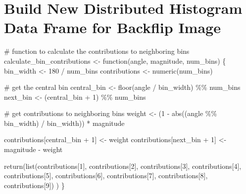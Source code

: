 \documentclass[
  letterpaper,
  DIV=11,
  numbers=noendperiod]{scrreprt}
\newenvironment{Shaded}{\begin{snugshade}}{\end{snugshade}}
\newcommand{\CommentTok}[1]{\textcolor[rgb]{0.37,0.37,0.37}{#1}}
\newcommand{\ControlFlowTok}[1]{\textcolor[rgb]{0.00,0.23,0.31}{#1}}
\newcommand{\DecValTok}[1]{\textcolor[rgb]{0.68,0.00,0.00}{#1}}
\newcommand{\FunctionTok}[1]{\textcolor[rgb]{0.28,0.35,0.67}{#1}}
\newcommand{\NormalTok}[1]{\textcolor[rgb]{0.00,0.23,0.31}{#1}}
\newcommand{\OtherTok}[1]{\textcolor[rgb]{0.00,0.23,0.31}{#1}}
\newcommand{\SpecialCharTok}[1]{\textcolor[rgb]{0.37,0.37,0.37}{#1}}
\begin{document}
\section{Build New Distributed Histogram Data Frame for Backflip
Image}\label{build-new-distributed-histogram-data-frame-for-backflip-image}

\begin{Shaded}
\begin{Highlighting}[]
\CommentTok{\# function to calculate the contributions to neighboring bins}
\NormalTok{calculate\_bin\_contributions }\OtherTok{\textless{}{-}} \ControlFlowTok{function}\NormalTok{(angle, magnitude, num\_bins) \{}
\NormalTok{  bin\_width }\OtherTok{\textless{}{-}} \DecValTok{180} \SpecialCharTok{/}\NormalTok{ num\_bins}
\NormalTok{  contributions }\OtherTok{\textless{}{-}} \FunctionTok{numeric}\NormalTok{(num\_bins)}
  
  \CommentTok{\# get the central bin}
\NormalTok{  central\_bin }\OtherTok{\textless{}{-}} \FunctionTok{floor}\NormalTok{(angle }\SpecialCharTok{/}\NormalTok{ bin\_width) }\SpecialCharTok{\%\%}\NormalTok{ num\_bins}
\NormalTok{  next\_bin }\OtherTok{\textless{}{-}}\NormalTok{ (central\_bin }\SpecialCharTok{+} \DecValTok{1}\NormalTok{) }\SpecialCharTok{\%\%}\NormalTok{ num\_bins}
  
  \CommentTok{\# get contributions to neighboring bins}
\NormalTok{  weight }\OtherTok{\textless{}{-}}\NormalTok{ (}\DecValTok{1} \SpecialCharTok{{-}} \FunctionTok{abs}\NormalTok{((angle }\SpecialCharTok{\%\%}\NormalTok{ bin\_width) }\SpecialCharTok{/}\NormalTok{ bin\_width)) }\SpecialCharTok{*}\NormalTok{ magnitude}
  
\NormalTok{  contributions[central\_bin }\SpecialCharTok{+} \DecValTok{1}\NormalTok{] }\OtherTok{\textless{}{-}}\NormalTok{ weight}
\NormalTok{  contributions[next\_bin }\SpecialCharTok{+} \DecValTok{1}\NormalTok{] }\OtherTok{\textless{}{-}}\NormalTok{ magnitude }\SpecialCharTok{{-}}\NormalTok{ weight}
  
  \FunctionTok{return}\NormalTok{(}\FunctionTok{list}\NormalTok{(contributions[}\DecValTok{1}\NormalTok{],}
\NormalTok{         contributions[}\DecValTok{2}\NormalTok{],}
\NormalTok{         contributions[}\DecValTok{3}\NormalTok{],}
\NormalTok{         contributions[}\DecValTok{4}\NormalTok{],}
\NormalTok{         contributions[}\DecValTok{5}\NormalTok{],}
\NormalTok{         contributions[}\DecValTok{6}\NormalTok{],}
\NormalTok{         contributions[}\DecValTok{7}\NormalTok{],}
\NormalTok{         contributions[}\DecValTok{8}\NormalTok{],}
\NormalTok{         contributions[}\DecValTok{9}\NormalTok{])}
\NormalTok{         )}
\NormalTok{\}}
\end{Highlighting}
\end{Shaded}
\end{document}
